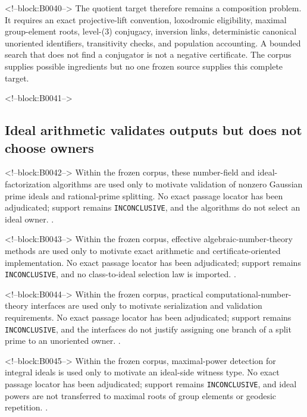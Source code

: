 \documentclass[11pt,a4paper]{article}
\begin{document}
<!--block:B0040-->
The quotient target therefore remains a composition problem. It requires an exact projective-lift convention, loxodromic eligibility, maximal group-element roots, level-(3) conjugacy, inversion links, deterministic canonical unoriented identifiers, transitivity checks, and population accounting. A bounded search that does not find a conjugator is not a negative certificate. The corpus supplies possible ingredients but no one frozen source supplies this complete target.

<!--block:B0041-->
\subsection{Ideal arithmetic validates outputs but does not choose owners}

<!--block:B0042-->
Within the frozen corpus, these number-field and ideal-factorization algorithms are used only to motivate validation of nonzero Gaussian prime ideals and rational-prime splitting. No exact passage locator has been adjudicated; support remains \texttt{INCONCLUSIVE}, and the algorithms do not select an ideal owner.
\citep{P29-S19}.

<!--block:B0043-->
Within the frozen corpus, effective algebraic-number-theory methods are used only to motivate exact arithmetic and certificate-oriented implementation. No exact passage locator has been adjudicated; support remains \texttt{INCONCLUSIVE}, and no class-to-ideal selection law is imported.
\citep{P29-S20}.

<!--block:B0044-->
Within the frozen corpus, practical computational-number-theory interfaces are used only to motivate serialization and validation requirements. No exact passage locator has been adjudicated; support remains \texttt{INCONCLUSIVE}, and the interfaces do not justify assigning one branch of a split prime to an unoriented owner.
\citep{P29-S21}.

<!--block:B0045-->
Within the frozen corpus, maximal-power detection for integral ideals is used only to motivate an ideal-side witness type. No exact passage locator has been adjudicated; support remains \texttt{INCONCLUSIVE}, and ideal powers are not transferred to maximal roots of group elements or geodesic repetition.
\citep{P29-S22}.
\end{document}
